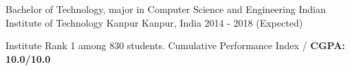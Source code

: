 


\begin{cventries}


\cventry
{Bachelor of Technology, major in Computer Science and Engineering} %
{Indian Institute of Technology Kanpur} %
{Kanpur, India} %
{2014 - 2018 (Expected)} %
{%
\begin{cvitems}
\item {Institute Rank 1 among 830 students. Cumulative Performance Index /
    \textbf{CGPA: 10.0/10.0}}
\end{cvitems}
}

\end{cventries}

